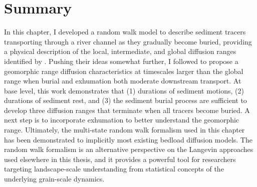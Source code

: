 \section{Summary}
\label{sec:conclusion}
In this chapter, I developed a random walk model to describe sediment tracers transporting through a river channel as they gradually become buried, providing a physical description of the local, intermediate, and global diffusion ranges identified by \citet{Nikora2002}.
Pushing their ideas somewhat further, I followed \citet{Hassan2017} to propose a geomorphic range \DIFdelbegin {}\DIFdelend \DIFaddbegin {}\DIFaddend diffusion characteristics at timescales larger than the global range when burial and exhumation both moderate downstream transport.
At base level, this work demonstrates that (1) durations of sediment motions, (2) durations of sediment rest, and (3) the sediment burial process are sufficient to develop three diffusion ranges that terminate when all tracers become buried.
\DIFdelbegin {}\DIFdelend A next step is to incorporate exhumation to better understand the geomorphic range.
Ultimately, the multi-state random walk formalism used in this chapter has been demonstrated to implicitly \DIFdelbegin {}\DIFdelend \DIFaddbegin {}\DIFaddend most existing bedload diffusion models.
The random walk formalism is an alternative perspective on the Langevin approaches used elsewhere in this thesis, and it provides a powerful tool for researchers targeting landscape-scale understanding from statistical concepts of the underlying grain-scale dynamics.
